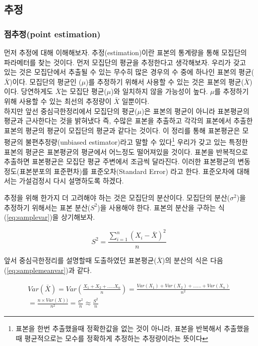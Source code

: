 \documentclass[
]{book}
\begin{document}
\subsection{추정}\label{uxcd94uxc815}

\subsubsection{점추정(point estimation)}\label{uxc810uxcd94uxc815point-estimation}

먼저 추정에 대해 이해해보자. 추정(estimation)이란 표본의 통계량을 통해 모집단의 파라메터를 찾는 것이다. 먼저 모집단의 평균을 추정한다고 생각해보자. 우리가 갖고 있는 것은 모집단에서 추출될 수 있는 무수히 많은 경우의 수 중에 하나인 표본의 평균(\(\bar{X}\))이다. 모집단의 평균인 (\(\mu\))를 추정하기 위해서 사용할 수 있는 것은 표본의 평균(\(\bar{X}\))이다. 당연하게도 \(\bar{X}\)는 모집단 평균(\(\mu\))와 일치하지 않을 가능성이 높다. \(\mu\)를 추정하기 위해 사용할 수 있는 최선의 추정량이 \(\bar{X}\) 일뿐이다.\\
하지만 앞선 중심극한정리에서 모집단의 평균(\(\mu\))은 표본의 평균이 아니라 표본평균의 평균과 근사한다는 것을 밝혀냈다 즉, 수많은 표본을 추출하고 각각의 표본에서 추출한 표본의 평균의 평균이 모집단의 평균과 같다는 것이다. 이 정리를 통해 표본평균은 모평균의 불편추정량(unbiased estimator)라고 말할 수 있다\footnote{표본을 한번 추출했을때 정확한값을 없는 것이 아니라, 표본을 반복해서 추출했을때 평균적으로는 모수를 정확하게 추정하는 추정량이라는 뜻이다}
우리가 갖고 있는 특정한 표본의 평균은 표본평균의 평균에서 어느정도 떨어져있을 것이다. 표본을 반복적으로 추출하면 표본평균은 모집단 평균 주변에서 조금씩 달라진다. 이러한 표본평균의 변동 정도(표본분포의 표준편차)를 표준오차(Standard Error) 라고 한다. 표준오차에 대해서는 가설검정시 다시 설명하도록 하겠다.

추정을 위해 한가지 더 고려해야 하는 것은 모집단의 분산이다. 모집단의 분산(\(\sigma^2\))을 추정하기 위해서는 표본 분산(\(S^2\))을 사용해야 한다. 표본의 분산을 구하는 식(\eqref{eq:samplevar})을 상기해보자.

\begin{equation}
S^2=\frac{\sum_{i=1}^{n}(X_i-\bar{X})^2}{n}
\label{eq:samplevar}
\end{equation}

앞서 중심극한정리를 설명할때 도출하였던 표본평균(\(\bar{X}\))의 분산의 식은 다음(\eqref{eq:samplemeanvar})과 같다.

\begin{equation}
\begin{array}{cl}
Var(\bar{X})=Var(\frac{X_1+X_2+.....X_n}{n})=\frac{Var(X_1)+Var(X_2)+......+Var(X_n)}{n^2}
\\
=\frac{n\times Var(X))}{n^2}=\frac{\sigma^2}{n}\approx \frac{S^2}{n}
\end{array}
\label{eq:samplemeanvar}
\end{equation}
\end{document}
